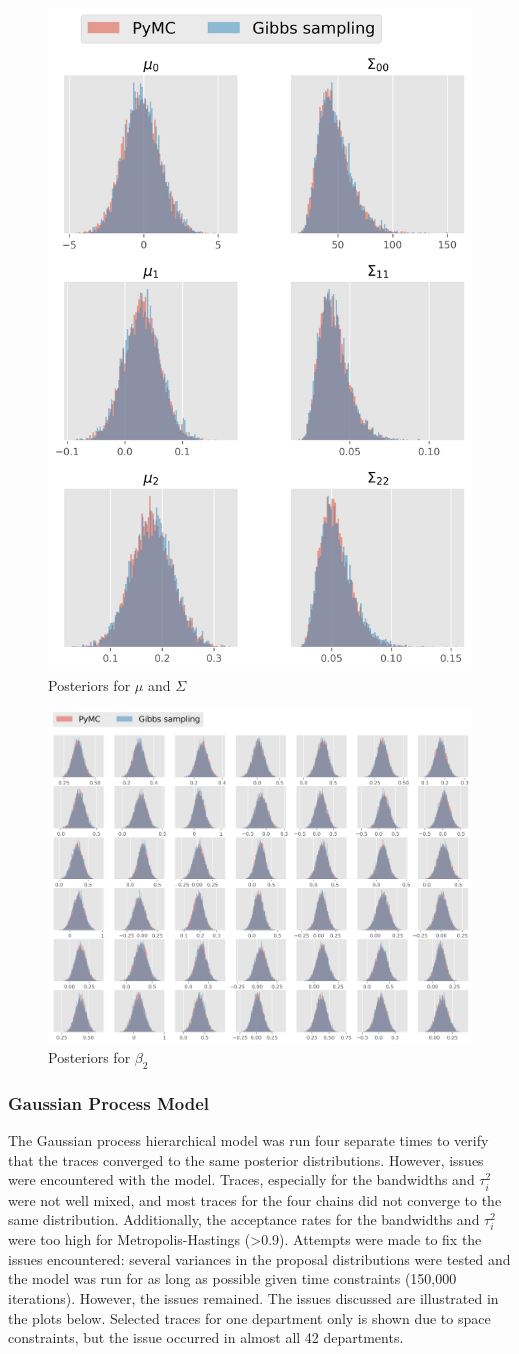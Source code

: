 \documentclass[paper=a4, fontsize=11pt]{scrartcl}
\begin{document}
\begin{figure}[!htb]\label{pymc1}
\centering
\includegraphics[width=.4\textwidth]{project/writeup/compare_gibbs_pymc1.png}
\caption{Posteriors for $\mu$ and $\Sigma$}
\end{figure}
\begin{figure}[!htb]\label{pymc2}
\centering
\includegraphics[width=.85\textwidth]{project/writeup/compare_gibbs_pymc2.png}
\caption{Posteriors for $\beta_2$}
\end{figure}

\newpage


\subsubsection{Gaussian Process Model}
The Gaussian process hierarchical model was run four separate times to verify that the traces converged to the same posterior distributions. However, issues were encountered with the model. Traces, especially for the bandwidths and $\tau^2_i$ were not well mixed, and most traces for the four chains did not converge to the same distribution. Additionally, the acceptance rates for the bandwidths and $\tau^2_i$ were too high for Metropolis-Hastings (>0.9). Attempts were made to fix the issues encountered: several variances in the proposal distributions were tested and the model was run for as long as possible given time constraints (150,000 iterations). However, the issues remained. The issues discussed are illustrated in the plots below. Selected traces for one department only is shown due to space constraints, but the issue occurred in almost all 42 departments.\\
\end{document}
